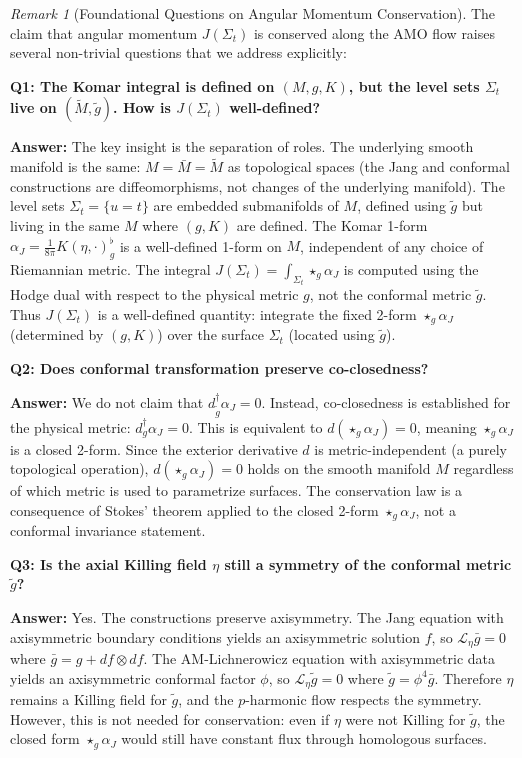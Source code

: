 \documentclass[12pt]{article}
\theoremstyle{plain}
\theoremstyle{definition}
\theoremstyle{remark}
\newtheorem{remark}[theorem]{Remark}
\begin{document}
\begin{remark}[Foundational Questions on Angular Momentum Conservation]\label{rem:J-foundations}
The claim that angular momentum $J(\Sigma_t)$ is conserved along the AMO flow raises several non-trivial questions that we address explicitly:

\textbf{Q1: The Komar integral is defined on $(M, g, K)$, but the level sets $\Sigma_t$ live on $(\tilde{M}, \tilde{g})$. How is $J(\Sigma_t)$ well-defined?}

\textbf{Answer:} The key insight is the separation of roles. The underlying smooth manifold is the same: $M = \bar{M} = \tilde{M}$ as topological spaces (the Jang and conformal constructions are diffeomorphisms, not changes of the underlying manifold). The level sets $\Sigma_t = \{u = t\}$ are embedded submanifolds of $M$, defined using $\tilde{g}$ but living in the same $M$ where $(g, K)$ are defined. The Komar 1-form $\alpha_J = \frac{1}{8\pi}K(\eta, \cdot)^\flat_g$ is a well-defined 1-form on $M$, independent of any choice of Riemannian metric. The integral $J(\Sigma_t) = \int_{\Sigma_t} \star_g \alpha_J$ is computed using the Hodge dual with respect to the physical metric $g$, not the conformal metric $\tilde{g}$. Thus $J(\Sigma_t)$ is a well-defined quantity: integrate the fixed 2-form $\star_g \alpha_J$ (determined by $(g, K)$) over the surface $\Sigma_t$ (located using $\tilde{g}$).

\textbf{Q2: Does conformal transformation preserve co-closedness?}

\textbf{Answer:} We do not claim that $d^\dagger_{\tilde{g}} \alpha_J = 0$. Instead, co-closedness is established for the physical metric: $d^\dagger_g \alpha_J = 0$. This is equivalent to $d(\star_g \alpha_J) = 0$, meaning $\star_g \alpha_J$ is a closed 2-form. Since the exterior derivative $d$ is metric-independent (a purely topological operation), $d(\star_g \alpha_J) = 0$ holds on the smooth manifold $M$ regardless of which metric is used to parametrize surfaces. The conservation law is a consequence of Stokes' theorem applied to the closed 2-form $\star_g \alpha_J$, not a conformal invariance statement.

\textbf{Q3: Is the axial Killing field $\eta$ still a symmetry of the conformal metric $\tilde{g}$?}

\textbf{Answer:} Yes. The constructions preserve axisymmetry. The Jang equation with axisymmetric boundary conditions yields an axisymmetric solution $f$, so $\mathcal{L}_\eta \bar{g} = 0$ where $\bar{g} = g + df \otimes df$. The AM-Lichnerowicz equation with axisymmetric data yields an axisymmetric conformal factor $\phi$, so $\mathcal{L}_\eta \tilde{g} = 0$ where $\tilde{g} = \phi^4 \bar{g}$. Therefore $\eta$ remains a Killing field for $\tilde{g}$, and the $p$-harmonic flow respects the symmetry. However, this is not needed for conservation: even if $\eta$ were not Killing for $\tilde{g}$, the closed form $\star_g \alpha_J$ would still have constant flux through homologous surfaces.


\end{remark}
\end{document}

